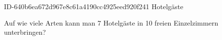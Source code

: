 \begin{exercise}
      {ID-640b6ea672d967e8c61a4190cc4925eed920f241}
      {Hotelgäste}
  \ifproblem\problem\par
    Auf wie viele Arten kann man 7 Hotelgäste in 10 freien Einzelzimmern
    unterbringen?
  \fi
\end{exercise}
